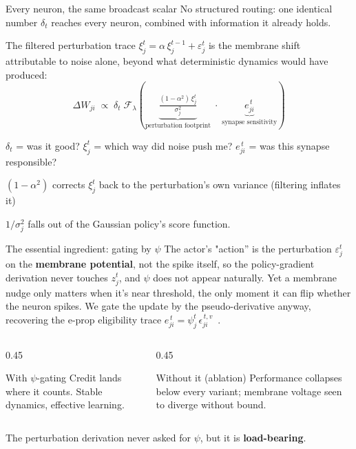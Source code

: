 \documentclass[aspectratio=169,11pt]{beamer}
\begin{document}
\begin{frame}{Every neuron, the same broadcast scalar}
  No structured routing: one identical number $\delta_t$ reaches every neuron,
  combined with information it already holds.
  
    The filtered perturbation
  trace $\xi_j^t = \alpha\,\xi_j^{t-1} + \varepsilon_j^t$ is the membrane shift
  attributable to noise alone, beyond what deterministic dynamics would
  have produced:
  \[
    \Delta W_{ji} \;\propto\;
      \delta_t\;
      \mathcal{F}_{\lambda}\!\left(
        \underbrace{\tfrac{(1-\alpha^2)\,\xi_j^t}{\sigma_j^2}}_{\text{perturbation footprint}}
        \;\cdot\;
        \underbrace{e^{\,t}_{ji}}_{\text{synapse sensitivity}}
      \right)
  \]
  \begin{center}\small
    \alert{$\delta_t$} = was it good? \quad
    \alert{$\xi_j^t$} = which way did noise push me? \quad
    \alert{$e^{\,t}_{ji}$} = was this synapse responsible?
  \end{center}
  \vfill
  \centering\footnotesize
  
  $(1-\alpha^2)$ corrects $\xi_j^t$ back to the perturbation's own variance
  (filtering inflates it)
  
  $1/\sigma_j^2$ falls out of the Gaussian policy's score function.
  \vfill
\end{frame}

\begin{frame}{The essential ingredient: gating by $\psi$}
  The actor's "action'' is the perturbation \(\varepsilon_j^t\) on the
  \textbf{membrane potential}, not the spike itself, so the policy-gradient
  derivation never touches $z_j^t$, and $\psi$ does not appear naturally.
  \vfill
  Yet a membrane nudge only matters when it's near threshold, the only
  moment it can flip whether the neuron spikes. We gate the update by the
  pseudo-derivative anyway, recovering the e-prop eligibility trace
  $e^{\,t}_{ji} = \psi_j^t\,\epsilon^{\,t,v}_{ji}$~\citep{eprop2020}.
  \vfill
  \begin{columns}[T]
    \begin{column}{0.45\textwidth}
      \begin{block}{With $\psi$-gating}
        Credit lands where it counts. Stable dynamics, effective learning.
      \end{block}
    \end{column}
    \begin{column}{0.45\textwidth}
      \begin{alertblock}{Without it (ablation)}
        Performance collapses below every variant; membrane voltage seen to diverge
        without bound.
      \end{alertblock}
    \end{column}
  \end{columns}
  \vfill
  \centering\small
  The perturbation derivation never asked for $\psi$, but it is
  \textbf{load-bearing}.
\end{frame}
\end{document}
